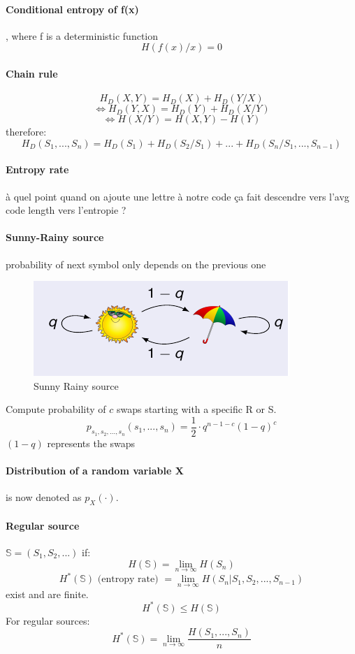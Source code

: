 \documentclass{article}
\begin{document}
\paragraph{Conditional entropy of f(x)}, where f is a deterministic function
\[ H(f(x)/x) = 0 \]

\paragraph{Chain rule}
\[ H_D(X, Y) = H_D(X) + H_D(Y/X) \]
\[ \Leftrightarrow H_D(Y, X) = H_D(Y) + H_D(X/Y) \]
\[ \Leftrightarrow H(X/Y) = H(X, Y) - H(Y) \]
therefore:
\[ H_D(S_1, ..., S_n) = H_D(S_1) + H_D(S_2/S_1) + ... + H_D(S_n/S_1, ..., S_{n-1}) \]

\paragraph{Entropy rate} à quel point quand on ajoute une lettre à notre code ça fait descendre vers l'avg code length vers l'entropie ?

\paragraph{Sunny-Rainy source} probability of next symbol only depends on the previous one

\begin{figure}[h]
    \centering
    \includegraphics[width=0.75\linewidth]{sunnyrain.png}
    \caption{Sunny Rainy source}
    \label{fig:enter-label}
\end{figure}

Compute probability of $ c $ swaps starting with a specific R or S.
\[ p_{s_1, s_2, ..., s_n}(s_1, ..., s_n) = \frac{1}{2} \cdot q^{n-1-c}(1-q)^c \]
$ (1-q) $ represents the swaps

\paragraph{Distribution of a random variable X} is now denoted as $ p_X(\cdot) $.

\paragraph{Regular source} $ \mathbb{S} = (S_1, S_2, ...) $ if:
\[ H(\mathbb{S}) = \lim_{n\to \infty} H(S_n) \]
\[ H^{*}(\mathbb{S}) \text{ (entropy rate) } = \lim_{n\to\infty} H(S_n|S_1,S_2,...,S_{n-1}) \]
exist and are finite.
\[ H^{*}(\mathbb{S}) \leq H(\mathbb{S}) \]
For regular sources:
\[ H^{*}(\mathbb{S}) = \lim_{n\to\infty} \frac{H(S_1,...,S_n)}{n} \]
\end{document}
